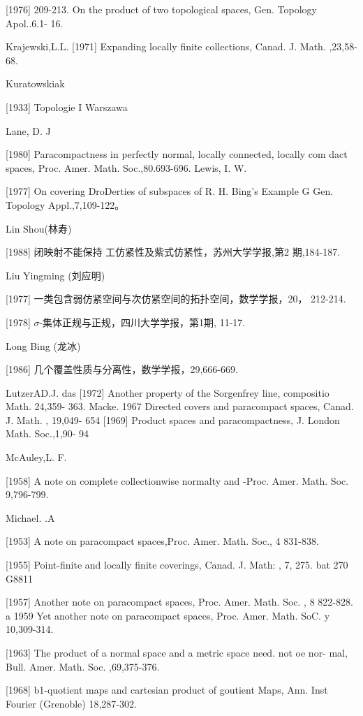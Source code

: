 \documentclass[main.tex]{subfiles}
\begin{document}
[1976]
209-213.
On the product of two topological spaces, Gen. Topology Apol..6.1-
16.

Krajewski,L.L.
[1971] Expanding locally finite collections, Canad. J. Math.
,23,58-68.

Kuratowskiak

[1933]
Topologie I Warszawa

Lane, D. J

[1980] Paracompactness in perfectly normal, locally connected, locally com
dact spaces, Proc. Amer. Math. Soc.,80.693-696.
Lewis, I. W.

[1977]
On covering DroDerties of subspaces of R. H. Bing's Example G
Gen. Topology Appl.,7,109-122。

\noindent Lin Shou(林寿)

[1988] 闭映射不能保持 工仿紧性及紫式仿紧性，苏州大学学报,第2
期,184-187.

\noindent Liu Yingming (刘应明)

[1977] 一类包含弱仿紧空间与次仿紧空间的拓扑空间，数学学报，20，
212-214.

[1978] $\sigma$-集体正规与正规，四川大学学报，第1期, 11-17.


\noindent Long Bing (龙冰)

[1986] 几个覆盖性质与分离性，数学学报，29,666-669.

\noindent LutzerAD.J.
das [1972]
Another property of the Sorgenfrey line, compositio Math. 24,359-
363.
Macke.
1967 Directed covers and paracompact spaces, Canad. J. Math. , 19,049-
654
[1969] Product spaces and paracompactness, J. London Math. Soc.,1,90-
94

\noindent McAuley,L. F.

[1958]
A note on complete collectionwise normalty and
-Proc. Amer. Math. Soc. 9,796-799.

\noindent Michael. .A

[1953]
	A note on paracompact spaces,Proc. Amer. Math. Soc., 4 831-838.
	
[1955]
	Point-finite and locally finite coverings, Canad. J. Math: , 7, 275.
	bat 270
	G8811

[1957]
	Another note on paracompact spaces, Proc. Amer. Math. Soc. , 8
	822-828.
	a 1959 Yet another note on paracompact spaces, Proc. Amer. Math.
	SoC. y
	10,309-314.

[1963]
	The product of a normal space and a metric space
	need. not oe nor-
	mal, Bull. Amer. Math. Soc. ,69,375-376.

[1968]
	b1-quotient maps and cartesian product of goutient Maps, Ann. Inst
	Fourier (Grenoble) 18,287-302.
\end{document}
